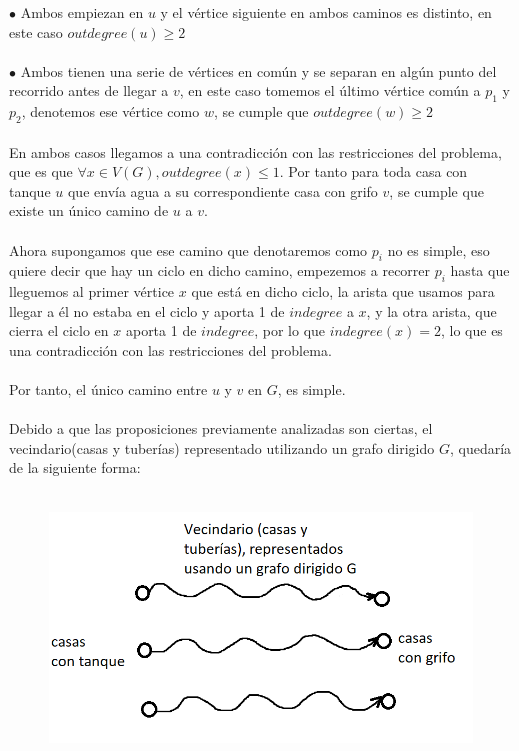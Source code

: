 \documentclass{article}
\begin{document}
    $\bullet$ Ambos empiezan en $u$ y el v\'ertice siguiente en ambos caminos es distinto, en este caso $outdegree(u) \geq 2$\\\\
    $\bullet$ Ambos tienen una serie de v\'ertices en com\'un y se separan en alg\'un punto del recorrido antes de llegar a $v$, 
    en este caso tomemos el \'ultimo v\'ertice com\'un a $p_1$ y $p_2$, denotemos ese v\'ertice como $w$, se cumple que $outdegree(w) \geq 2$\\\\

    En ambos casos llegamos a una contradicci\'on con las restricciones del problema, que es que $\forall x \in V(G), outdegree(x) \leq 1$. 
    Por tanto para toda casa con tanque $u$ que env\'ia agua a su correspondiente casa con grifo $v$, se cumple que existe un \'unico camino de $u$ a $v$.\\\\

    Ahora supongamos que ese camino que denotaremos como $p_i$ no es simple, eso quiere decir que hay un ciclo en dicho camino, empezemos a recorrer $p_i$ hasta 
    que lleguemos al primer v\'ertice $x$ que est\'a en dicho ciclo, la arista que usamos para llegar a \'el no estaba en el ciclo y aporta 1 de $indegree$ a $x$,
     y la otra arista, que cierra el ciclo en $x$ aporta 1 de $indegree$, por lo que $indegree(x) = 2$, lo que es una contradicci\'on con las restricciones del problema.\\\\

    Por tanto, el \'unico camino entre $u$ y $v$ en $G$, es simple.\\\\

    Debido a que las proposiciones previamente analizadas son ciertas, el vecindario(casas y tuber\'ias) representado utilizando un grafo dirigido $G$, quedar\'ia de la siguiente forma:\\\\

    \begin{figure}[h]
        \includegraphics[scale = 0.5]{img/Image1Problem1.png}
        \centering
    \end{figure}
\end{document}
